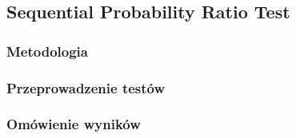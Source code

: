 \newpage
\subsection{Sequential Probability Ratio Test}
\label{subsec:sequential-probability-ratio-test}

\subsubsection{Metodologia}

\subsubsection{Przeprowadzenie testów}
\subsubsection{Omówienie wyników}